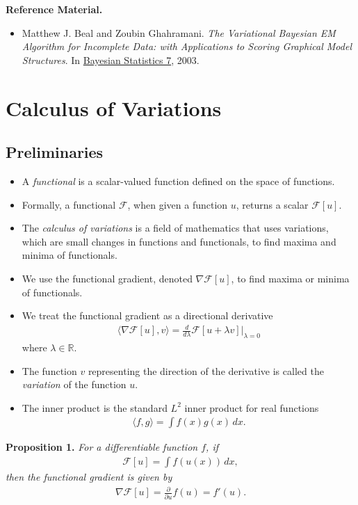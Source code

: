 \documentclass[10pt]{article}
\newcommand{\FF}{\mathcal{F}}
\begin{document}
\textbf{Reference Material.}
\begin{itemize}
\item Matthew J. Beal and Zoubin Ghahramani. \textit{The Variational Bayesian EM Algorithm for Incomplete Data: with Applications to Scoring Graphical Model Structures}. In \underline{Bayesian Statistics 7}, 2003.
\end{itemize}

\newpage

\appendix

\section{Calculus of Variations}

\subsection{Preliminaries}

\begin{itemize}
\item A \textit{functional} is a scalar-valued function defined on the space of functions.
\item Formally, a functional $\FF$, when given a function $u$, returns a scalar $\FF[u]$.
\item The \textit{calculus of variations} is a field of mathematics that uses variations, which are small changes in functions and functionals, to find maxima and minima of functionals.
\item We use the functional gradient, denoted $\nabla \FF[u]$, to find maxima or minima of functionals.
\item We treat the functional gradient as a directional derivative
\begin{align} \label{eq:grad}
\langle \nabla \FF[u], v \rangle = \frac{d}{d\lambda} \FF[u + \lambda v] \bigg\rvert_{\lambda = 0}
\end{align}
where $\lambda \in \mathbb{R}$.
\item The function $v$ representing the direction of the derivative is called the \textit{variation} of the function $u$.
\item The inner product is the standard $L^2$ inner product for real functions
\begin{align*}
\langle f, g \rangle = \int f(x) g(x) \, dx.
\end{align*}
\end{itemize}

\textbf{Proposition 1.} \textit{For a differentiable function $f$, if}
\begin{align*}
\FF[u] = \int f(u(x)) \, dx,
\end{align*}
\textit{then the functional gradient is given by}
\begin{align*}
\nabla \FF[u] = \frac{\partial}{\partial u} f(u) = f'(u).
\end{align*}
\end{document}
